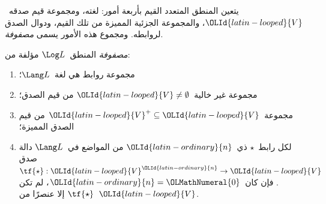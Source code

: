 \documentclass[../../../include/open-logic-section]{subfiles}
\begin{document}


يتعين المنطق المتعدد القيم بأربعة أمور: لغته، ومجموعة قيم صدقه~$\OLId{latin-looped}{V}$،
والمجموعة الجزئية المميزة من تلك القيم، ودوال الصدق لروابطه. ومجموع
هذه الأمور يسمى \emph{مصفوفة}.

\begin{defn}[المصفوفة]
\emph{مصفوفة} المنطق~$\Log L$ مؤلفة من:
\begin{enumerate}
\item مجموعة روابط هي لغة~$\Lang L$؛
\item مجموعة غير خالية~$\OLId{latin-looped}{V} \neq \emptyset$ من قيم الصدق؛
\item مجموعة~$\OLId{latin-looped}{V}^+ \subseteq \OLId{latin-looped}{V}$ من قيم الصدق المميزة؛
\item لكل رابط~$\star$ ذي~$\OLId{latin-ordinary}{n}$ من المواضع في~$\Lang L$ دالة صدق
$\tf{\star} : \OLId{latin-looped}{V}^\OLId{latin-ordinary}{n} \to \OLId{latin-looped}{V}$. فإن كان~$\OLId{latin-ordinary}{n} = \OLMathNumeral{0}$، لم تكن
$\tf{\star}$ إلا عنصرًا من~$\OLId{latin-looped}{V}$.
\end{enumerate}
\end{defn}
\end{document}
